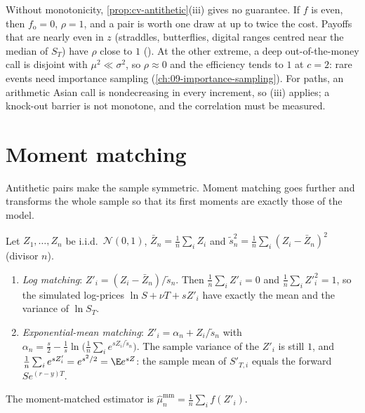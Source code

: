 \begin{remark}\label{rem:cv-antithetic-fails}
Without monotonicity, \cref{prop:cv-antithetic}(iii) gives no guarantee. If $f$ is even,
then $f_{\mathrm o}=0$, $\rho=1$, and a pair is worth one draw at up to twice the cost. Payoffs
that are nearly even in $z$ (straddles, butterflies, digital ranges centred near the median of
$S_T$) have $\rho$ close to $1$ (). At the other extreme, a deep
out-of-the-money call is disjoint with $\mu^2\ll\sigma^2$, so $\rho\approx0$ and the
efficiency tends to $1$ at $c=2$: rare events need importance sampling
(\cref{ch:09-importance-sampling}). For paths, an arithmetic Asian call is nondecreasing in
every increment, so (iii) applies; a knock-out barrier is not monotone, and the
correlation must be measured.
\end{remark}


\section{Moment matching}\label{sec:cv-mm}

Antithetic pairs make the sample symmetric. Moment matching goes further and transforms the
whole sample so that its first moments are exactly those of the model.

\begin{definition}\label{def:cv-mm}
Let $Z_1,\dots,Z_n$ be i.i.d.\ $\mathcal N(0,1)$, $\bar Z_n=\frac1n\sum_iZ_i$ and
$\tilde s_n^2=\frac1n\sum_i(Z_i-\bar Z_n)^2$ (divisor $n$).
\begin{enumerate}[label=(\alph*)]
  \item \emph{Log matching}: $Z'_i=(Z_i-\bar Z_n)/\tilde s_n$. Then
    $\frac1n\sum_iZ'_i=0$ and $\frac1n\sum_iZ'^2_i=1$, so the simulated log-prices
    $\ln S+\nu T+sZ'_i$ have exactly the mean and the variance of $\ln S_T$.
  \item \emph{Exponential-mean matching}: $Z'_i=\alpha_n+Z_i/\tilde s_n$ with
    $\alpha_n=\frac s2-\frac1s\ln\big(\frac1n\sum_ie^{sZ_i/\tilde s_n}\big)$. The sample variance
    of the $Z'_i$ is still $1$, and $\frac1n\sum_ie^{sZ'_i}=e^{s^2/2}=\E e^{sZ}$: the sample
    mean of $S'_{T,i}$ equals the forward $Se^{(r-y)T}$.
\end{enumerate}
The moment-matched estimator is $\hat\mu^{\mathrm{mm}}_n=\frac1n\sum_if(Z'_i)$.
\end{definition}

